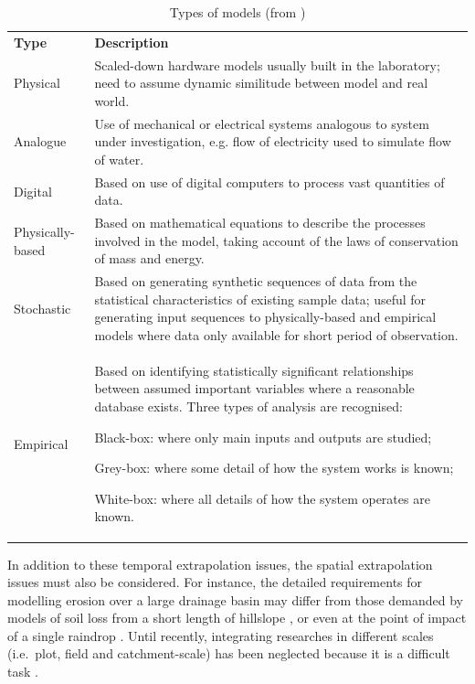 \begin{table}
  \centering
  \caption[Types of models]{Types of models
(from \citealp{morgan1995-soil})}
  \label{tab:TypesOfModels}
    \small
    \begin{tabular}{lp{150.0mm}}
    \toprule
    \textbf{Type} & \textbf{Description}\\
    Physical & Scaled-down hardware models usually built in the
laboratory; need to assume dynamic similitude between model and real world.\\
    \midrule
    Analogue & Use of mechanical or electrical systems analogous to
system under investigation, e.g. flow of electricity used to simulate flow of
water.\\
    \midrule
    Digital & Based on use of digital computers to process vast
quantities of data.\\
    \midrule
    Physically-based & Based on mathematical equations to describe
the processes involved in the model, taking account of the laws of conservation
of mass and energy.\\
    \midrule
    Stochastic & Based on generating synthetic sequences of data
from the statistical characteristics of existing sample data; useful for
generating input sequences to physically-based and empirical models where data
only available for short period of observation.\\
    \midrule
    Empirical & Based on identifying statistically significant
relationships between assumed important variables where a reasonable database
exists. Three types of analysis are recognised:
    \begin{compactitem}[-]
      \item Black-box: where only main inputs and outputs
are studied;
      \item Grey-box: where some detail of how the system
works is known;
      \item White-box: where all details of how the system
operates are known.
    \end{compactitem}\\
    \bottomrule
    \end{tabular}
\end{table}

In addition to these temporal extrapolation issues, the spatial extrapolation
issues must also be considered. For instance, the detailed requirements for
modelling erosion over a large drainage basin \citep{hooke2000-1778} may differ
from those demanded by models of soil loss from a short length of hillslope
\citep{goff1993-698}, or even at the point of impact of a single raindrop
\citep{sharma1991-301}. Until recently, integrating researches in different
scales (i.e.\ plot, field and catchment-scale) has been neglected because it is
a difficult task \citep{boardman1996-489}.

